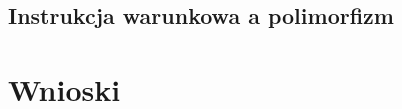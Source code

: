 \documentclass{article}
\begin{document}
\subsection{Instrukcja warunkowa a polimorfizm}


\section{Wnioski}
\end{document}
